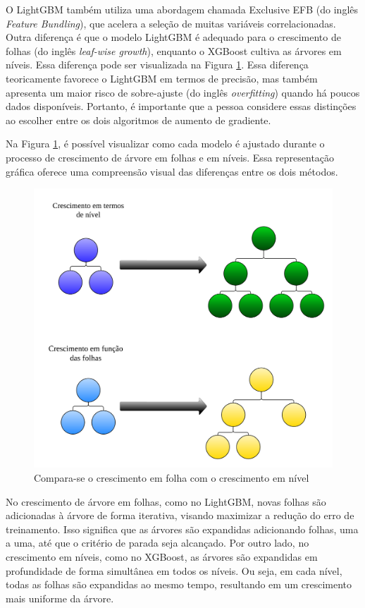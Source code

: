 O LightGBM também utiliza uma abordagem chamada Exclusive EFB (do inglês \textit{Feature Bundling}), que acelera a seleção de muitas variáveis correlacionadas. Outra diferença é que o modelo LightGBM é adequado para o crescimento de folhas (do inglês \textit{leaf-wise growth}), enquanto o XGBoost cultiva as árvores em níveis. Essa diferença pode ser visualizada na Figura \ref{fig:xgboost}.
Essa diferença teoricamente favorece o LightGBM em termos de precisão, mas também apresenta um maior risco de sobre-ajuste (do inglês \textit{overfitting}) quando há poucos dados disponíveis. Portanto, é importante que a pessoa considere essas distinções ao escolher entre os dois algoritmos de aumento de gradiente.

Na Figura \ref{fig:xgboost}, é possível visualizar como cada modelo é ajustado durante o processo de crescimento de árvore em folhas e em níveis. Essa representação gráfica oferece uma compreensão visual das diferenças entre os dois métodos.

\begin{figure}[H]
	\centering
	\caption{Compara-se o crescimento em folha com o crescimento em nível}
	\label{fig:xgboost}
	\includegraphics[width=0.7\linewidth]{Modelos/Figuras/xgboost}
	
\end{figure}


No crescimento de árvore em folhas, como no LightGBM, novas folhas são adicionadas à árvore de forma iterativa, visando maximizar a redução do erro de treinamento. Isso significa que as árvores são expandidas adicionando folhas, uma a uma, até que o critério de parada seja alcançado.
Por outro lado, no crescimento em níveis, como no XGBoost, as árvores são expandidas em profundidade de forma simultânea em todos os níveis. Ou seja, em cada nível, todas as folhas são expandidas ao mesmo tempo, resultando em um crescimento mais uniforme da árvore.

